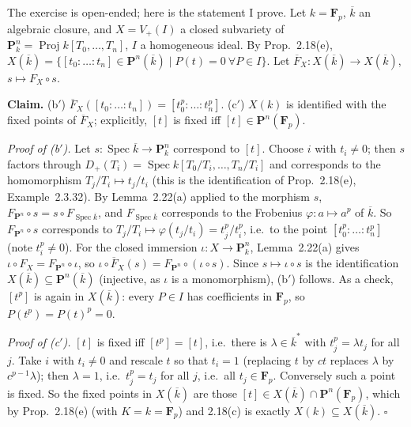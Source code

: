 \documentclass[11pt]{article}
\begin{document}
\pf
The exercise is open-ended; here is the statement I prove. Let $k=\mathbf F_p$, $\overline k$ an algebraic closure, and $X=V_+(I)$ a closed subvariety of $\mathbf P^n_k=\operatorname{Proj}k[T_0,\dots,T_n]$, $I$ a homogeneous ideal. By Prop.~2.18(e), $X(\overline k)=\{[t_0:\dots:t_n]\in\mathbf P^n(\overline k)\mid P(t)=0\ \forall P\in I\}$. Let $\overline F_X:X(\overline k)\to X(\overline k)$, $s\mapsto F_X\circ s$.

\textbf{Claim.} (b$'$) $\overline F_X([t_0:\dots:t_n])=[t_0^p:\dots:t_n^p]$. (c$'$) $X(k)$ is identified with the fixed points of $\overline F_X$; explicitly, $[t]$ is fixed iff $[t]\in\mathbf P^n(\mathbf F_p)$.

\emph{Proof of (b$'$).} Let $s:\operatorname{Spec}\overline k\to\mathbf P^n_k$ correspond to $[t]$. Choose $i$ with $t_i\neq0$; then $s$ factors through $D_+(T_i)=\operatorname{Spec}k[T_0/T_i,\dots,T_n/T_i]$ and corresponds to the homomorphism $T_j/T_i\mapsto t_j/t_i$ (this is the identification of Prop.~2.18(e), Example~2.3.32). By Lemma~2.22(a) applied to the morphism $s$, $F_{\mathbf P^n}\circ s=s\circ F_{\operatorname{Spec}\overline k}$, and $F_{\operatorname{Spec}\overline k}$ corresponds to the Frobenius $\varphi:a\mapsto a^p$ of $\overline k$. So $F_{\mathbf P^n}\circ s$ corresponds to $T_j/T_i\mapsto\varphi(t_j/t_i)=t_j^p/t_i^p$, i.e.\ to the point $[t_0^p:\dots:t_n^p]$ (note $t_i^p\neq0$). For the closed immersion $\iota:X\to\mathbf P^n_k$, Lemma~2.22(a) gives $\iota\circ F_X=F_{\mathbf P^n}\circ\iota$, so $\iota\circ\overline F_X(s)=F_{\mathbf P^n}\circ(\iota\circ s)$. Since $s\mapsto\iota\circ s$ is the identification $X(\overline k)\subseteq\mathbf P^n(\overline k)$ (injective, as $\iota$ is a monomorphism), (b$'$) follows. As a check, $[t^p]$ is again in $X(\overline k)$: every $P\in I$ has coefficients in $\mathbf F_p$, so $P(t^p)=P(t)^p=0$.

\emph{Proof of (c$'$).} $[t]$ is fixed iff $[t^p]=[t]$, i.e.\ there is $\lambda\in\overline k^*$ with $t_j^p=\lambda t_j$ for all $j$. Take $i$ with $t_i\neq0$ and rescale $t$ so that $t_i=1$ (replacing $t$ by $ct$ replaces $\lambda$ by $c^{p-1}\lambda$); then $\lambda=1$, i.e.\ $t_j^p=t_j$ for all $j$, i.e.\ all $t_j\in\mathbf F_p$. Conversely such a point is fixed. So the fixed points in $X(\overline k)$ are those $[t]\in X(\overline k)\cap\mathbf P^n(\mathbf F_p)$, which by Prop.~2.18(e) (with $K=k=\mathbf F_p$) and 2.18(c) is exactly $X(k)\subseteq X(\overline k)$. \hfill$\square$
\end{document}
